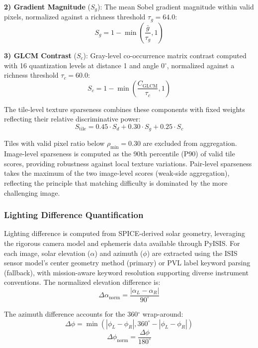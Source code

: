 \documentclass[lettersize,journal]{IEEEtran}
\newcommand{\pyisis}{PyISIS}
\begin{document}
\textbf{2) Gradient Magnitude} ($S_g$): The mean Sobel gradient magnitude within valid pixels, normalized against a richness threshold $\tau_g = 64.0$:
\begin{equation}
S_g = 1 - \min\left(\frac{\bar{g}}{\tau_g}, 1\right)
\end{equation}

\textbf{3) GLCM Contrast} ($S_c$): Gray-level co-occurrence matrix contrast computed with 16 quantization levels at distance 1 and angle 0$^\circ$, normalized against a richness threshold $\tau_c = 60.0$:
\begin{equation}
S_c = 1 - \min\left(\frac{C_{\text{GLCM}}}{\tau_c}, 1\right)
\end{equation}

The tile-level texture sparseness combines these components with fixed weights reflecting their relative discriminative power:
\begin{equation}
S_{\text{tile}} = 0.45 \cdot S_d + 0.30 \cdot S_g + 0.25 \cdot S_c
\end{equation}

Tiles with valid pixel ratio below $\rho_{\min} = 0.30$ are excluded from aggregation. Image-level sparseness is computed as the 90th percentile (P90) of valid tile scores, providing robustness against local texture variations. Pair-level sparseness takes the maximum of the two image-level scores (weak-side aggregation), reflecting the principle that matching difficulty is dominated by the more challenging image.

\subsubsection{Lighting Difference Quantification}

Lighting difference is computed from SPICE-derived solar geometry, leveraging the rigorous camera model and ephemeris data available through \pyisis{}. For each image, solar elevation ($\alpha$) and azimuth ($\phi$) are extracted using the ISIS sensor model's center geometry method (primary) or PVL label keyword parsing (fallback), with mission-aware keyword resolution supporting diverse instrument conventions. The normalized elevation difference is:
\begin{equation}
\Delta\alpha_{\text{norm}} = \frac{|\alpha_L - \alpha_R|}{90^\circ}
\end{equation}

The azimuth difference accounts for the 360$^\circ$ wrap-around:
\begin{equation}
\Delta\phi = \min(|\phi_L - \phi_R|, 360^\circ - |\phi_L - \phi_R|)
\end{equation}
\begin{equation}
\Delta\phi_{\text{norm}} = \frac{\Delta\phi}{180^\circ}
\end{equation}
\end{document}
